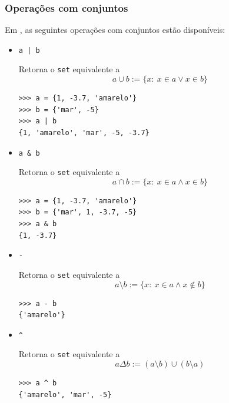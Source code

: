 \subsubsection{Operações com conjuntos}

Em {\python}, as seguintes operações com conjuntos estão disponíveis:

\begin{itemize}
\item \lstinline+a | b+ 

  Retorna o \lstinline+set+ equivalente a
  \begin{equation}
    a \cup b := \{x:~x\in a \lor x\in b\}
  \end{equation}

  
\begin{lstlisting}[framexrightmargin=-2.5em]
>>> a = {1, -3.7, 'amarelo'}
>>> b = {'mar', -5}
>>> a | b
{1, 'amarelo', 'mar', -5, -3.7}
\end{lstlisting}

\item \lstinline+a & b+ 
  
  Retorna o \lstinline+set+ equivalente a
  \begin{equation}
    a \cap b := \{x:~x\in a \land x\in b\}
  \end{equation}

\begin{lstlisting}[framexrightmargin=-2.5em]
>>> a = {1, -3.7, 'amarelo'}
>>> b = {'mar', 1, -3.7, -5}
>>> a & b
{1, -3.7}
\end{lstlisting}

\item \lstinline+-+ 

  Retorna o \lstinline+set+ equivalente a
  \begin{equation}
    a \setminus b := \{x:~x\in a \land x\not\in b\}
  \end{equation}

\begin{lstlisting}[framexrightmargin=-2.5em]
>>> a - b
{'amarelo'}
\end{lstlisting}

\item \lstinline+^+ 

  Retorna o \lstinline+set+ equivalente a
  \begin{equation}
    a \Delta b := (a\setminus b)\cup (b\setminus a)
  \end{equation}

\begin{lstlisting}[framexrightmargin=-2.5em]
>>> a ^ b
{'amarelo', 'mar', -5}
\end{lstlisting}
\end{itemize}


